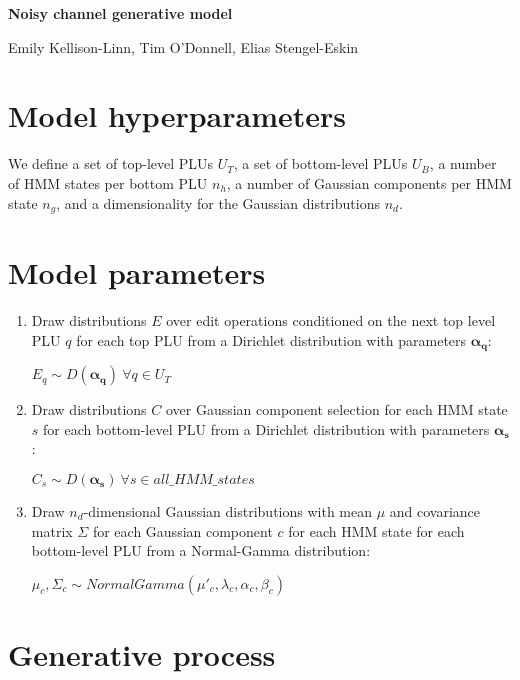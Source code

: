 \documentclass[11pt]{article}
\newcommand{\bs}{\boldsymbol}
\newcommand{\myindent}{\hspace{2cm}}
\begin{document}
\begin{center}
	
	{\Large \textbf{Noisy channel generative model}}

	{\normalsize Emily Kellison-Linn, Tim O'Donnell, Elias Stengel-Eskin}
			
\end{center}

\section{Model hyperparameters}

We define a set of top-level PLUs $U_T$, a set of bottom-level PLUs $U_B$, a number of HMM states per bottom PLU $n_h$, a number of Gaussian components per HMM state $n_g$, and a dimensionality for the Gaussian distributions $n_d$.

\section{Model parameters}

\begin{enumerate}

\item Draw distributions $E$ over edit operations conditioned on the next top level PLU $q$ for each top PLU from a Dirichlet distribution with parameters $\bs{\alpha_q}$:

\myindent $E_q \sim D(\bs{\alpha_{q}}) ~ \forall q \in U_T$

\item Draw distributions $C$ over Gaussian component selection for each HMM state $s$ for each bottom-level PLU from a Dirichlet distribution with parameters $\bs{\alpha_{s}}$:

\myindent $C_{s} \sim D(\bs{\alpha_{s}}) ~ \forall s \in all\_HMM\_states$

\item Draw $n_d$-dimensional Gaussian distributions with mean $\mu$ and covariance matrix $\Sigma$ for each Gaussian component $c$ for each HMM state for each bottom-level PLU from a Normal-Gamma distribution:

\myindent $\mu_c, \Sigma_c \sim NormalGamma(\mu'_c, \lambda_c, \alpha_c, \beta_c)$

\end{enumerate}

\section{Generative process}
\end{document}
